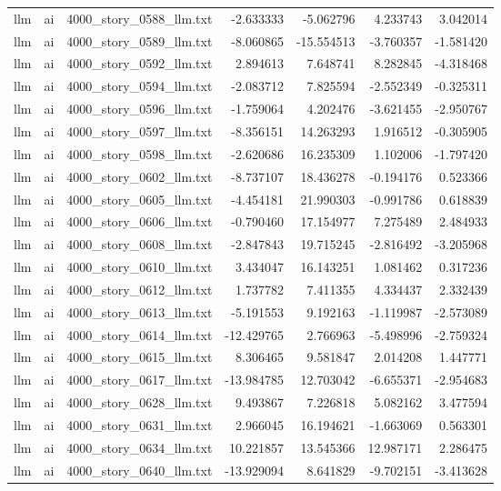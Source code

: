 \begin{longtable}{lllrrrr}
llm & ai & 4000\_story\_0588\_llm.txt & -2.633333 & -5.062796 & 4.233743 & 3.042014 \\
llm & ai & 4000\_story\_0589\_llm.txt & -8.060865 & -15.554513 & -3.760357 & -1.581420 \\
llm & ai & 4000\_story\_0592\_llm.txt & 2.894613 & 7.648741 & 8.282845 & -4.318468 \\
llm & ai & 4000\_story\_0594\_llm.txt & -2.083712 & 7.825594 & -2.552349 & -0.325311 \\
llm & ai & 4000\_story\_0596\_llm.txt & -1.759064 & 4.202476 & -3.621455 & -2.950767 \\
llm & ai & 4000\_story\_0597\_llm.txt & -8.356151 & 14.263293 & 1.916512 & -0.305905 \\
llm & ai & 4000\_story\_0598\_llm.txt & -2.620686 & 16.235309 & 1.102006 & -1.797420 \\
llm & ai & 4000\_story\_0602\_llm.txt & -8.737107 & 18.436278 & -0.194176 & 0.523366 \\
llm & ai & 4000\_story\_0605\_llm.txt & -4.454181 & 21.990303 & -0.991786 & 0.618839 \\
llm & ai & 4000\_story\_0606\_llm.txt & -0.790460 & 17.154977 & 7.275489 & 2.484933 \\
llm & ai & 4000\_story\_0608\_llm.txt & -2.847843 & 19.715245 & -2.816492 & -3.205968 \\
llm & ai & 4000\_story\_0610\_llm.txt & 3.434047 & 16.143251 & 1.081462 & 0.317236 \\
llm & ai & 4000\_story\_0612\_llm.txt & 1.737782 & 7.411355 & 4.334437 & 2.332439 \\
llm & ai & 4000\_story\_0613\_llm.txt & -5.191553 & 9.192163 & -1.119987 & -2.573089 \\
llm & ai & 4000\_story\_0614\_llm.txt & -12.429765 & 2.766963 & -5.498996 & -2.759324 \\
llm & ai & 4000\_story\_0615\_llm.txt & 8.306465 & 9.581847 & 2.014208 & 1.447771 \\
llm & ai & 4000\_story\_0617\_llm.txt & -13.984785 & 12.703042 & -6.655371 & -2.954683 \\
llm & ai & 4000\_story\_0628\_llm.txt & 9.493867 & 7.226818 & 5.082162 & 3.477594 \\
llm & ai & 4000\_story\_0631\_llm.txt & 2.966045 & 16.194621 & -1.663069 & 0.563301 \\
llm & ai & 4000\_story\_0634\_llm.txt & 10.221857 & 13.545366 & 12.987171 & 2.286475 \\
llm & ai & 4000\_story\_0640\_llm.txt & -13.929094 & 8.641829 & -9.702151 & -3.413628 \\

\end{longtable}
